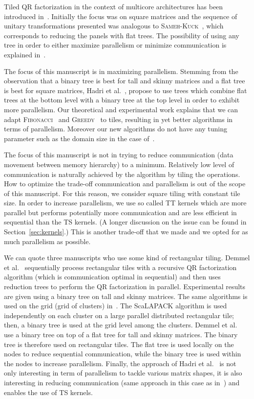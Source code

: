 \documentclass[a4paper,twopages]{article}
\newcommand{\SK}{\textsc{Sameh-Kuck}\xspace}
\newcommand{\MC}{\textsc{Fibonacci}\xspace}
\newcommand{\Greedy}{\textsc{Greedy}\xspace}
\begin{document}
Tiled QR factorization in the context of multicore architectures has been
introduced in~\cite{Buttari2008,tileplasma,Quintana:2009}. Initially the focus
was on square matrices and the sequence of unitary transformations presented
was analogous to \SK~\cite{SamehKuck78}, which corresponds to reducing the panels with flat trees.
The possibility of using any tree in order to either
maximize parallelism or minimize communication is explained in~\cite{CAQR}.

The focus of this manuscript is in maximizing parallelism.  Stemming from the
observation that a binary tree is best for tall and skinny matrices and a flat
tree is best for square matrices, Hadri et al.~\cite{Hadri_ipdps_2010}, propose
to use trees which combine flat trees at the bottom level with a binary tree at
the top level in order to exhibit more parallelism.  Our theoretical and
experimental work explains that we can adapt \MC~\cite{ModiClarke84} and
\Greedy~\cite{j12,j14} to tiles, resulting in yet better algorithms in terms of
parallelism. Moreover our new algorithms do not have any tuning parameter such
as the domain size in the case of~\cite{Hadri_ipdps_2010}.

The focus of this manuscript is not in trying to reduce communication (data
movement between memory hierarchy) to a minimum.  Relatively low level of communication is
naturally achieved by the algorithm by tiling the operations.
How to optimize the trade-off communication and parallelism is out of the scope of this manuscript.
For this reason, we consider square tiling with constant tile size.
In order to
increase parallelism, we use so called TT kernels which are more parallel but
performs potentially more communication and are less efficient in sequential
than the TS kernels. (A longer discussion on the issue can be found in Section~\ref{sec:kernels}.)
This is another trade-off that we made and we opted for as much parallelism as possible.

We can quote three manuscripts who use some kind of rectangular tiling.  Demmel et
al.~\cite{CAQR} sequentially process rectangular tiles with a recursive QR
factorization algorithm (which is communication optimal in sequential) and then
uses reduction trees to perform the QR factorization in parallel.  Experimental
results are given using a binary tree on tall and skinny matrices. The same algorithms 
is used on the grid (grid of clusters) in~\cite{tsqr-grid}. 
The ScaLAPACK algorithm is used independently on each cluster on a large parallel distributed rectangular tile;
then, a binary tree is used at the grid level among the clusters.
Demmel et
al.~\cite{mohiyuddin:SC09} use a binary tree on top of a flat tree for tall and
skinny matrices. The binary tree is therefore used on rectangular tiles. The flat tree is used locally on the nodes to reduce
sequential communication, while the binary tree is used within the nodes to
increase parallelism.  Finally, the approach of Hadri et
al.~\cite{Hadri_ipdps_2010} is not only interesting in term of parallelism to
tackle various matrix shapes, it is also interesting
in reducing communication (same approach in this case as
in~\cite{mohiyuddin:SC09}) and enables the use of TS kernels.
\end{document}
